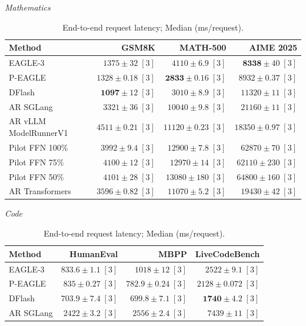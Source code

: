 \documentclass[conference,onecolumn]{IEEEtran}
\begin{document}
\begin{table}[!htp]
\centering\small
\setlength{\tabcolsep}{3pt}
\caption{End-to-end request latency; Median (ms/request).}
\label{tab:appendix-metric-completion-median-none}
\textit{Mathematics}\par\smallskip
\begin{tabular}{@{}>{\raggedright\arraybackslash}p{3.7cm}rrr@{}}
\toprule
Method & GSM8K & MATH-500 & AIME 2025 \\
\midrule
EAGLE-3 & \(1375 \pm 32\;[3]\) & \(4110 \pm 6.9\;[3]\) & \(\mathbf{8338} \pm 40\;[3]\) \\
P-EAGLE & \(1328 \pm 0.18\;[3]\) & \(\mathbf{2833} \pm 0.16\;[3]\) & \(8932 \pm 0.37\;[3]\) \\
DFlash & \(\mathbf{1097} \pm 12\;[3]\) & \(3010 \pm 8.9\;[3]\) & \(11320 \pm 11\;[3]\) \\
AR \textperiodcentered{} SGLang & \(3321 \pm 36\;[3]\) & \(10040 \pm 9.8\;[3]\) & \(21160 \pm 11\;[3]\) \\
AR \textperiodcentered{} vLLM ModelRunnerV1 & \(4511 \pm 0.21\;[3]\) & \(11120 \pm 0.23\;[3]\) & \(18350 \pm 0.97\;[3]\) \\
Pilot FFN 100\% & \(3992 \pm 9.4\;[3]\) & \(12900 \pm 7.8\;[3]\) & \(62870 \pm 70\;[3]\) \\
Pilot FFN 75\% & \(4100 \pm 12\;[3]\) & \(12970 \pm 14\;[3]\) & \(62110 \pm 230\;[3]\) \\
Pilot FFN 50\% & \(4101 \pm 28\;[3]\) & \(13080 \pm 180\;[3]\) & \(64800 \pm 160\;[3]\) \\
AR \textperiodcentered{} Transformers & \(3596 \pm 0.82\;[3]\) & \(11070 \pm 5.2\;[3]\) & \(19430 \pm 42\;[3]\) \\
\bottomrule
\end{tabular}\par\medskip
\textit{Code}\par\smallskip
\begin{tabular}{@{}>{\raggedright\arraybackslash}p{3.7cm}rrr@{}}
\toprule
Method & HumanEval & MBPP & LiveCodeBench \\
\midrule
EAGLE-3 & \(833.6 \pm 1.1\;[3]\) & \(1018 \pm 12\;[3]\) & \(2522 \pm 9.1\;[3]\) \\
P-EAGLE & \(835 \pm 0.27\;[3]\) & \(782.9 \pm 0.24\;[3]\) & \(2128 \pm 0.072\;[3]\) \\
DFlash & \(\mathbf{703.9} \pm 7.4\;[3]\) & \(\mathbf{699.8} \pm 7.1\;[3]\) & \(\mathbf{1740} \pm 4.2\;[3]\) \\
AR \textperiodcentered{} SGLang & \(2422 \pm 3.2\;[3]\) & \(2556 \pm 2.4\;[3]\) & \(7439 \pm 11\;[3]\) \\

\end{tabular}
\end{table}
\end{document}
